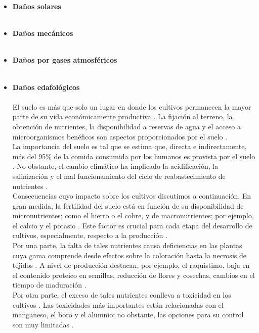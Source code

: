 \begin{itemize}[leftmargin=0cm, itemsep=0.5 cm]

\item[]\textbf{Daños solares\\}\\
\item[]\textbf{Daños mecánicos\\}\\
\item[]\textbf{Daños por gases atmosféricos\\}\\
\item[]\textbf{Daños edafológicos\\}\\
El suelo es más que solo un lugar en donde los cultivos permanecen la mayor parte de su vida económicamente productiva \cite{Passioura_2002}. La fijación al terreno, la obtención de nutrientes, la disponibilidad a reservas de agua y el acceso a microorganismos benéficos son aspectos proporcionados por el suelo \cite{Hatfield_2017}.\\

La importancia del suelo es tal que se estima que, directa e indirectamente, más del 95\% de la comida consumida por los humanos es provista por el suelo \cite{Kopittke_2019}. No obstante, el cambio climático ha implicado la acidificación, la salinización y el mal funcionamiento del ciclo de reabastecimiento de nutrientes \cite{Hamidov_2018}.\\

Consecuencias cuyo impacto sobre los cultivos discutimos a continuación. En gran medida, la fertilidad del suelo está en función de su disponibilidad de micronutrientes; como el hierro o el cobre, y de macronutrientes; por ejemplo, el calcio y el potasio \cite{Berbecea_2024}. Este factor es crucial para cada etapa del desarrollo de cultivos, especialmente, respecto a la producción \cite{Wang_2014}.\\

Por una parte, la falta de tales nutrientes causa deficiencias en las plantas cuya gama comprende desde efectos sobre la coloración hasta la necrosis de tejidos \cite{Uchida_2000}. A nivel de producción destacan, por ejemplo, el raquistimo, baja en el contenido proteico en semillas, reducción de flores y cosechas, cambios en el tiempo de maduración \cite{Uchida_2000}.\\

Por otra parte, el exceso de tales nutrientes conlleva a toxicidad en los cultivos \cite{Ngoune_2020}. Las toxicidades más importantes están relacionadas con el manganeso, el boro y el alumnio; no obstante, las opciones para su control son muy limitadas \cite{Langridge_2022}.\\ 


\end{itemize}
